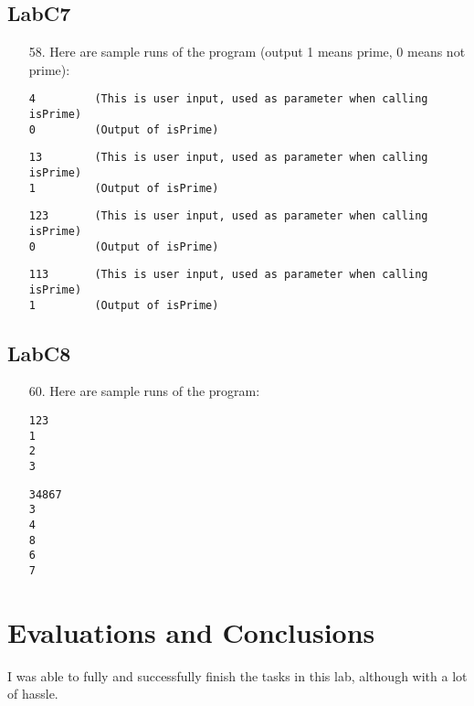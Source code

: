 \documentclass{article}
\begin{document}
\subsection{LabC7}
\begin{enumerate}
\item[58. ] Here are sample runs of the program (output 1 means prime, 0 means not prime):
\begin{verbatim}
4         (This is user input, used as parameter when calling isPrime)
0         (Output of isPrime)
\end{verbatim}
\begin{verbatim}
13        (This is user input, used as parameter when calling isPrime)
1         (Output of isPrime)
\end{verbatim}
\begin{verbatim}
123       (This is user input, used as parameter when calling isPrime)
0         (Output of isPrime)
\end{verbatim}
\begin{verbatim}
113       (This is user input, used as parameter when calling isPrime)
1         (Output of isPrime)
\end{verbatim}
\end{enumerate}

\subsection{LabC8}
\begin{enumerate}
\item[60. ] Here are sample runs of the program:
\begin{verbatim}
123
1
2
3
\end{verbatim}
\begin{verbatim}
34867
3
4
8
6
7
\end{verbatim}
\end{enumerate}



\section{Evaluations and Conclusions}
I was able to fully and successfully finish the tasks in this lab, although with a lot of hassle.\newline
\end{document}

